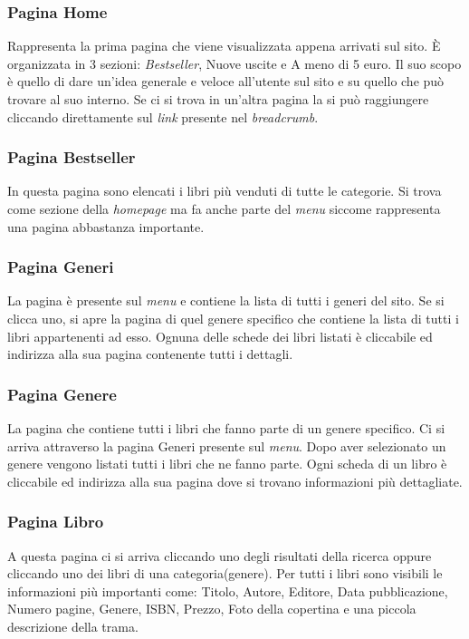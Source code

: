 \subsubsection{Pagina Home}
Rappresenta la prima pagina che viene visualizzata appena arrivati sul sito. È organizzata in 3 sezioni: \textit{Bestseller}, Nuove uscite e A meno di 5 euro. Il suo scopo è quello di dare un'idea generale e veloce all'utente sul sito e su quello che può trovare al suo interno. Se ci si trova in un’altra pagina la si può raggiungere cliccando direttamente sul \textit{link} presente nel \textit{breadcrumb}.

\subsubsection{Pagina Bestseller}
In questa pagina sono elencati i libri più venduti di tutte le categorie. Si trova come sezione della \textit{homepage} ma fa anche parte del \textit{menu} siccome rappresenta una pagina abbastanza importante.

\subsubsection{Pagina Generi}
La pagina è presente sul \textit{menu} e contiene la lista di tutti i generi del sito. Se si clicca uno, si apre la pagina di quel genere specifico che contiene la lista di tutti i libri appartenenti ad esso. Ognuna delle schede dei libri listati è cliccabile ed indirizza alla sua pagina contenente tutti i dettagli. 

\subsubsection{Pagina Genere}
La pagina che contiene tutti i libri che fanno parte di un genere specifico. Ci si arriva attraverso la pagina Generi presente sul \textit{menu}. Dopo aver selezionato un genere vengono listati tutti i libri che ne fanno parte. Ogni scheda di un libro è cliccabile ed indirizza alla sua pagina dove si trovano informazioni più dettagliate.

\subsubsection{Pagina Libro}
A questa pagina ci si arriva cliccando uno degli risultati della ricerca oppure cliccando uno dei libri di una categoria(genere). Per tutti i libri sono visibili le informazioni più importanti come: Titolo, Autore, Editore, Data pubblicazione, Numero pagine, Genere, ISBN, Prezzo, Foto della copertina e una piccola descrizione della trama.

